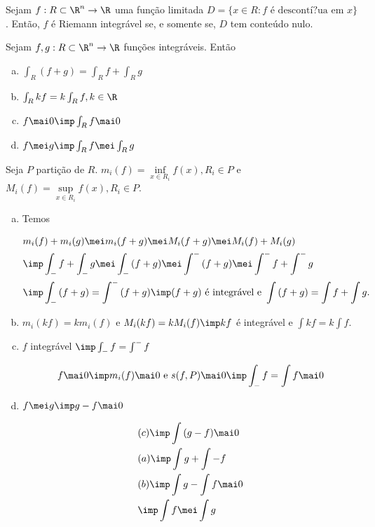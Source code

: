 \documentclass{book}
\begin{document}
\begin{teo}
Sejam $f:R \subset \R^n \to \R$ uma fun\c c\~ao limitada $D=\{ x \in R: f \text{ \'e descont\'i?ua em $x$} \}$. Ent\~ao, $f$ \'e Riemann integr\'avel se, e somente se, $D$ tem conte\'udo nulo.
\end{teo}

\begin{prop}
Sejam $f,g:R \subset \R^n \to \R$ fun\c c\~oes integr\'aveis. Ent\~ao

\begin{enumerate}[a)]
 \item $\int_R (f + g) = \int_R f + \int_R g$
 \item $\int_R kf = k \int_R f, k \in \R$
 \item $f \mai 0 \imp \int_R f \mai 0$
 \item $f \mei g \imp \int_R f \mei \int_R g$
\end{enumerate}

\end{prop}

\begin{dem}
Seja $P$ parti\c c\~ao de $R$. $m_i (f) = \mathop {\inf}\limits_{x \in R_i} f(x), R_i \in P$ e $M_i (f) = \mathop {\sup}\limits_{x \in R_i} f(x), R_i \in P$.

\begin{enumerate}[a)]
 \item Temos

\[
\begin{gathered}
  m_i (f) + m_i (g) \mei m_i (f + g) \mei M_i (f + g) \mei M_i (f) + M_i (g) \hfill \\
  \imp \int_{-} f  + \int_{-} g \mei \int_{-} {(f + g)} \mei \int^{-}  {(f + g)} \mei \int^{-}  f  + \int^{-}  g  \hfill \\
  \imp \int_{-} {(f + g)}  = \int^{-}  {(f + g)} \imp(f + g) \text{ \'e integr\'avel e } \int {(f + g)} = \int f + \int g. \hfill \\ 
\end{gathered} 
\]

 \item $m_i (kf) = k m_i (f)$ e $M_i (kf) = k M_i (f) \imp kf$ \'e integr\'avel e $\int kf = k \int f$.

 \item $f$ integr\'avel $\imp \int_{-} f = \int^{-} f$

\[
f \mai 0 \imp m_i (f) \mai 0 \text{ e } s(f,P) \mai 0 \imp \int_{-} f = \int f \mai 0
\]

 \item $f \mei g \imp g - f \mai 0$

\[
\begin{gathered}
  (c) \imp \int {(g - f) \mai 0}  \hfill \\
  (a) \imp \int g  + \int { - f}  \hfill \\
  (b) \imp \int g  - \int f \mai 0 \hfill \\
  \imp \int f \mei \int g  \hfill \\ 
\end{gathered} 
\]

\end{enumerate}

\end{dem}
\end{document}

